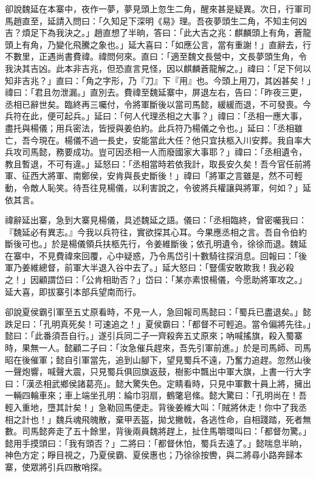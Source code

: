 卻說魏延在本寨中，夜作一夢，夢見頭上忽生二角，醒來甚是疑異。次日，行軍司馬趙直至，延請入問曰：「久知足下深明《易》理。吾夜夢頭生二角，不知主何凶吉？煩足下為我決之。」趙直想了半晌，答曰：「此大吉之兆：麒麟頭上有角，蒼龍頭上有角，乃變化飛騰之象也。」延大喜曰：「如應公言，當有重謝！」直辭去，行不數里，正遇尚書費禕。禕問何來。直曰：「適至魏文長營中，文長夢頭生角，令我決其吉凶。此本非吉兆，但恐直言見怪，因以麒麟蒼龍解之。」禕曰：「足下何以知非吉兆？」直曰：「角之字形，乃『刀』下『用』也。今頭上用刀，其凶甚矣！」禕曰：「君且勿泄漏。」直別去。費禕至魏延寨中，屏退左右，告曰：「昨夜三更，丞相已辭世矣。臨終再三囑付，令將軍斷後以當司馬懿，緩緩而退，不可發喪。今兵符在此，便可起兵。」延曰：「何人代理丞相之大事？」禕曰：「丞相一應大事，盡托與楊儀；用兵密法，皆授與姜伯約。此兵符乃楊儀之令也。」延曰：「丞相雖亡，吾今現在。楊儀不過一長史，安能當此大任？他只宜扶柩入川安葬。我自率大兵攻司馬懿，務要成功。豈可因丞相一人而廢國家大事耶？」禕曰：「丞相遺令，教且暫退，不可有違。」延怒曰：「丞相當時若依我計，取長安久矣！吾今官任前將軍、征西大將軍、南鄭侯，安肯與長史斷後！」禕曰「將軍之言雖是，然不可輕動，令敵人恥笑。待吾往見楊儀，以利害說之，令彼將兵權讓與將軍，何如？」延依其言。

禕辭延出寨，急到大寨見楊儀，具述魏延之語。儀曰：「丞相臨終，曾密囑我曰：『魏延必有異志。』今我以兵符往，實欲探其心耳。今果應丞相之言。吾自令伯約斷後可也。」於是楊儀領兵扶柩先行，令姜維斷後；依孔明遺令，徐徐而退。魏延在寨中，不見費禕來回覆，心中疑惑，乃令馬岱引十數騎往探消息。回報曰：「後軍乃姜維總督，前軍大半退入谷中去了。」延大怒曰：「豎儒安敢欺我！我必殺之！」因顧謂岱曰：「公肯相助否？」岱曰：「某亦素恨楊儀，今愿助將軍攻之。」延大喜，即拔寨引本部兵望南而行。

卻說夏侯霸引軍至五丈原看時，不見一人，急回報司馬懿曰：「蜀兵已盡退矣。」懿跌足曰：「孔明真死矣！可速追之！」夏侯霸曰：「都督不可輕追。當令偏將先往。」懿曰：「此番須吾自行。」遂引兵同二子一齊殺奔五丈原來；吶喊搖旗，殺入蜀寨時，果無一人。懿顧二子曰：「汝急催兵趕來，吾先引軍前進。」於是司馬師、司馬昭在後催軍；懿自引軍當先，追到山腳下，望見蜀兵不遠，乃奮力追趕。忽然山後一聲炮響，喊聲大震，只見蜀兵俱回旗返鼓，樹影中飄出中軍大旗，上書一行大字曰：「漢丞相武鄉侯諸葛亮」。懿大驚失色。定睛看時，只見中軍數十員上將，擁出一輛四輪車來；車上端坐孔明：綸巾羽扇，鶴氅皂絛。懿大驚曰：「孔明尚在！吾輕入重地，墮其計矣！」急勒回馬便走。背後姜維大叫：「賊將休走！你中了我丞相之計也！」魏兵魂飛魄散，棄甲丟盔，拋戈撇戟，各逃性命，自相踐踏，死者無數。司馬懿奔走了五十餘里，背後兩員魏將趕上，扯住馬嚼環叫曰：「都督勿驚。」懿用手摸頭曰：「我有頭否？」二將曰：「都督休怕，蜀兵去遠了。」懿喘息半晌，神色方定；睜目視之，乃夏侯霸、夏侯惠也；乃徐徐按轡，與二將尋小路奔歸本寨，使眾將引兵四散哨探。

